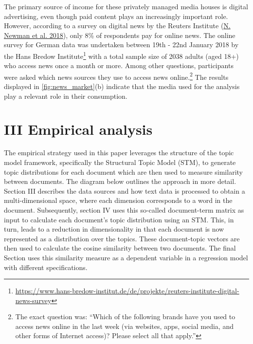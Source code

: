 \documentclass[
  12pt,
]{article}
\begin{document}
The primary source of income for these privately managed media houses is
digital advertising, even though paid content plays an increasingly
important role. However, according to a survey on digital news by the
Reuters Institute (\protect\hyperlink{ref-newman_reuters_2018}{N. Newman
et al. 2018}), only 8\% of respondents pay for online news. The online
survey for German data was undertaken between 19th - 22nd January 2018
by the Hans Bredow Institute\footnote{\url{https://www.hans-bredow-institut.de/de/projekte/reuters-institute-digital-news-survey}}
with a total sample size of 2038 adults (aged 18+) who access news once
a month or more. Among other questions, participants were asked which
news sources they use to access news online.\footnote{The exact question
  was: ``Which of the following brands have you used to access news
  online in the last week (via websites, apps, social media, and other
  forms of Internet access)? Please select all that apply.''} The
results displayed in \autoref{fig:news_market}(b) indicate that the
media used for the analysis play a relevant role in their consumption.

\hypertarget{iii-empirical-analysis}{%
\section{III Empirical analysis}\label{iii-empirical-analysis}}

The empirical strategy used in this paper leverages the structure of the
topic model framework, specifically the Structural Topic Model (STM), to
generate topic distributions for each document which are then used to
measure similarity between documents. The diagram below outlines the
approach in more detail. Section III describes the data sources and how
text data is processed to obtain a multi-dimensional space, where each
dimension corresponds to a word in the document. Subsequently, section
IV uses this so-called document-term matrix as input to calculate each
document's topic distribution using an STM. This, in turn, leads to a
reduction in dimensionality in that each document is now represented as
a distribution over the topics. These document-topic vectors are then
used to calculate the cosine similarity between two documents. The final
Section uses this similarity measure as a dependent variable in a
regression model with different specifications.
\end{document}
